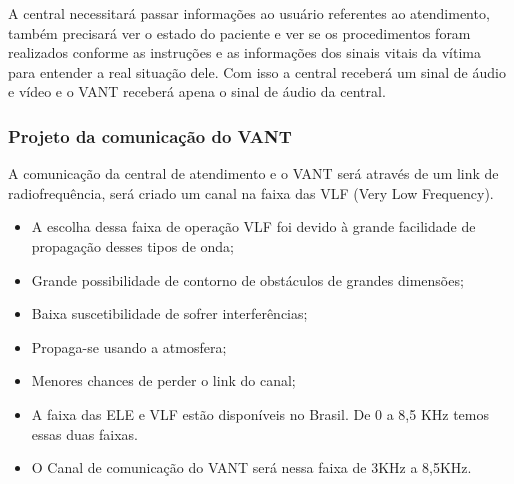 A central necessitará passar informações ao usuário referentes ao atendimento, também precisará ver o estado do paciente e ver se os procedimentos foram realizados conforme as instruções e as informações dos sinais vitais da vítima para entender a real situação dele. Com isso a central receberá um sinal de áudio e vídeo e o VANT receberá apena o sinal de áudio da central. 

\subsubsection{Projeto da comunicação do VANT}
A comunicação da central de atendimento e o VANT será através de um link de radiofrequência, será criado um canal na faixa das VLF (Very Low Frequency).

\begin{itemize}
	\item A escolha dessa faixa de operação VLF foi devido à grande facilidade de propagação desses tipos de onda;
	\item Grande possibilidade de contorno de obstáculos de grandes dimensões;
	\item Baixa suscetibilidade de sofrer interferências;
	\item Propaga-se usando a atmosfera;
	\item Menores chances de perder o link do canal;
	\item A faixa das ELE e VLF estão disponíveis no Brasil. De 0 a 8,5 KHz temos essas duas faixas.
	\item O Canal de comunicação do VANT será nessa faixa de 3KHz a 8,5KHz.
\end{itemize}

\pagebreak
